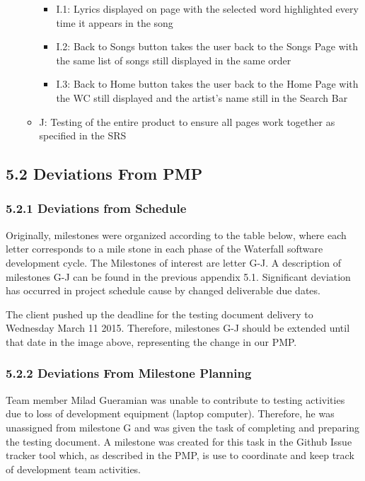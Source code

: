 \documentclass[]{article}
\begin{document}
\begin{itemize}
\begin{itemize}
    \begin{itemize}
    \itemsep1pt\parskip0pt
    \item
      I.1: Lyrics displayed on page with the selected word highlighted
      every time it appears in the song
    \item
      I.2: Back to Songs button takes the user back to the Songs Page
      with the same list of songs still displayed in the same order
    \item
      I.3: Back to Home button takes the user back to the Home Page with
      the WC still displayed and the artist's name still in the Search
      Bar
    \end{itemize}
  \item
    J: Testing of the entire product to ensure all pages work together
    as specified in the SRS
  \end{itemize}
\end{itemize}

\subsection{\textbf{5.2 Deviations From PMP}}\label{deviations-from-pmp}

\subsubsection{\textbf{5.2.1 Deviations from
Schedule}}\label{deviations-from-schedule}

Originally, milestones were organized according to the table below,
where each letter corresponds to a mile stone in each phase of the
Waterfall software development cycle. The Milestones of interest are
letter G-J. A description of milestones G-J can be found in the previous
appendix 5.1. Significant deviation has occurred in project schedule
cause by changed deliverable due dates.

The client pushed up the deadline for the testing document delivery to
Wednesday March 11 2015. Therefore, milestones G-J should be extended
until that date in the image above, representing the change in our PMP.

\subsubsection{\textbf{5.2.2 Deviations From Milestone
Planning}}\label{deviations-from-milestone-planning}

Team member Milad Gueramian was unable to contribute to testing
activities due to loss of development equipment (laptop computer).
Therefore, he was unassigned from milestone G and was given the task of
completing and preparing the testing document. A milestone was created
for this task in the Github Issue tracker tool which, as described in
the PMP, is use to coordinate and keep track of development team
activities.
\end{document}
